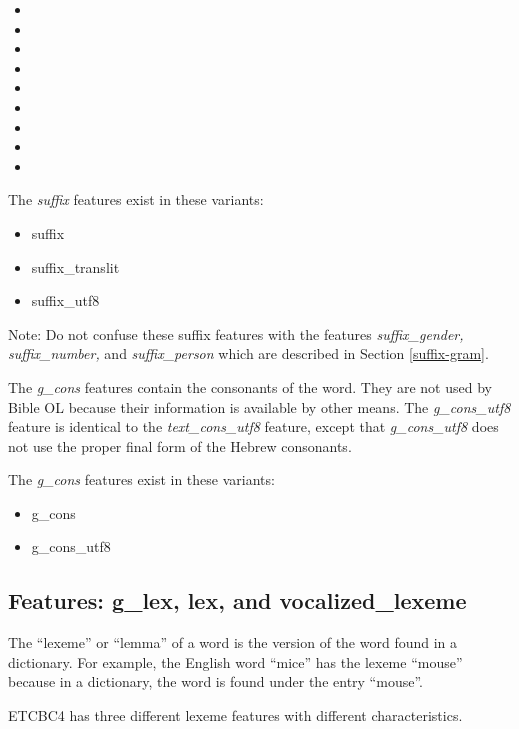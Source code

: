 \documentclass[11pt,oneside,a4paper]{memoir}
\newcommand{\heb}[1]{{\RL {\ezr #1}}}
\begin{document}
\begin{itemize}
\item \heb{־}
\item \heb{׃}
\item \heb{ס}
\item \heb{פ}
\item \heb{׃ נ}
\item \heb{׃ נ ס}
\item \heb{׃ נ פ}
\item \heb{׃ ס}
\item \heb{׃ פ}
\end{itemize}

The \emph{suffix} features exist in these variants:

\begin{itemize}
\item suffix
\item suffix\_translit
\item suffix\_utf8
\end{itemize}

Note: Do not confuse these suffix features with the features \emph{suffix\_gender,} \emph{suffix\_number,} and
\emph{suffix\_person} which are described in Section \ref{suffix-gram}.


The \emph{g\_cons} features contain the consonants of the word. They are not used by Bible OL
because their information is available by other means. The \emph{g\_cons\_utf8} feature is identical to
the \emph{text\_cons\_utf8} feature, except that \emph{g\_cons\_utf8} does not use the proper final form
of the Hebrew consonants.


The \emph{g\_cons} features exist in these variants:

\begin{itemize}
\item g\_cons
\item g\_cons\_utf8
\end{itemize}


\subsection{Features: g\_lex, lex, and vocalized\_lexeme}

The ``lexeme'' or ``lemma'' of a word is the version of the word found in a dictionary. For example,
the English word ``mice'' has the lexeme ``mouse'' because in a dictionary, the word is found under
the entry ``mouse''.

ETCBC4 has three different lexeme features with different characteristics.
\end{document}
